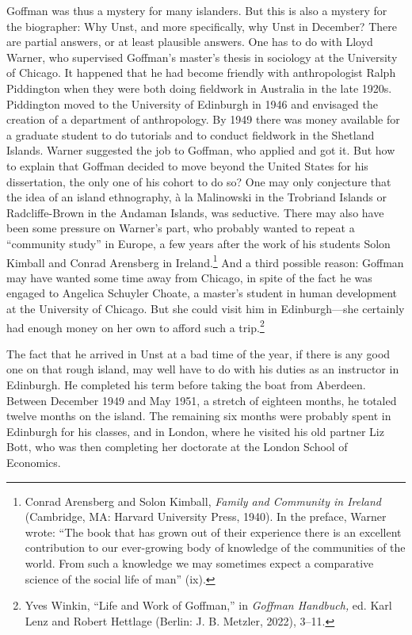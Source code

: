 \documentclass[openany,nobib]{tufte-book}
\begin{document}
\noindent Goffman was thus a mystery for many islanders. But this is also a
mystery for the biographer: Why Unst, and more specifically, why Unst in
December? There are partial answers, or at least plausible answers. One
has to do with Lloyd Warner, who supervised Goffman's master's thesis in
sociology at the University of Chicago. It happened that he had become
friendly with anthropologist Ralph Piddington when they were both doing
fieldwork in Australia in the late 1920s. Piddington moved to the
University of Edinburgh in 1946 and envisaged the creation of a
department of anthropology. By 1949 there was money available for a
graduate student to do tutorials and to conduct fieldwork in the
Shetland Islands. Warner suggested the job to Goffman, who applied and
got it. But how to explain that Goffman decided to move beyond the
United States for his dissertation, the only one of his cohort to do so?
One may only conjecture that the idea of an island ethnography, à la
Malinowski in the Trobriand Islands or Radcliffe-Brown in the Andaman
Islands, was seductive. There may also have been some pressure on
Warner's part, who probably wanted to repeat a ``community study'' in
Europe, a few years after the work of his students Solon Kimball and
Conrad Arensberg in Ireland.\footnote{Conrad Arensberg and Solon
  Kimball, \emph{Family and Community in Ireland} (Cambridge, MA:
  Harvard University Press, 1940). In the preface, Warner wrote: ``The
  book that has grown out of their experience there is an excellent
  contribution to our ever-growing body of knowledge of the communities
  of the world. From such a knowledge we may sometimes expect a
  comparative science of the social life of man'' (ix).} And a third
possible reason: Goffman may have wanted some time away from Chicago, in
spite of the fact he was engaged to Angelica Schuyler Choate, a master's
student in human development at the University of Chicago. But she could
visit him in Edinburgh---she certainly had enough money on her own to
afford such a trip.\footnote{Yves Winkin, ``Life and Work of Goffman,''
  in \emph{Goffman Handbuch,} ed. Karl Lenz and Robert Hettlage (Berlin:
  J. B. Metzler, 2022), 3--11.}

The fact that he arrived in Unst at a bad time of the year, if there is
any good one on that rough island, may well have to do with his duties
as an instructor in Edinburgh. He completed his term before taking the
boat from Aberdeen. Between December 1949 and May 1951, a stretch of
eighteen months, he totaled twelve months on the island. The remaining
six months were probably spent in Edinburgh for his classes, and in
London, where he visited his old partner Liz Bott, who was then
completing her doctorate at the London School of Economics.
\end{document}
